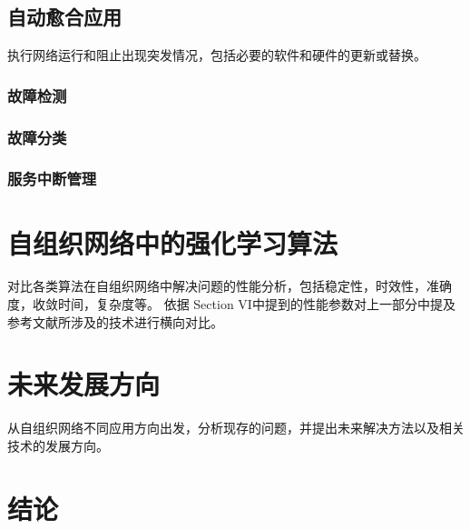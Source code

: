 \documentclass{IEEEtran}
\begin{document}
\subsection{自动愈合应用}

执行网络运行和阻止出现突发情况，包括必要的软件和硬件的更新或替换。
\subsubsection{故障检测}
\subsubsection{故障分类}
\subsubsection{服务中断管理}

\section{自组织网络中的强化学习算法}
\label{sec:Compare}
对比各类算法在自组织网络中解决问题的性能分析，包括稳定性，时效性，准确度，收敛时间，复杂度等。
依据 \cite{Klaine2017} Section  VI中提到的性能参数对上一部分中提及参考文献所涉及的技术进行横向对比。

\section{未来发展方向}
\label{sec:Conclusion}
从自组织网络不同应用方向出发，分析现存的问题，并提出未来解决方法以及相关技术的发展方向。

\section{结论}





\end{document}
